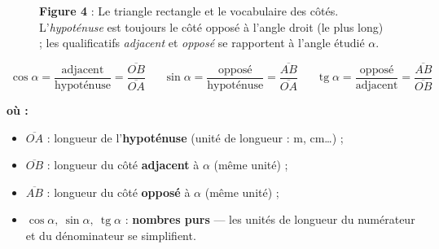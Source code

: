 \documentclass[11pt,a4paper]{article}
\newenvironment{ou}{%
  \par\smallskip\noindent\textbf{où :}\nopagebreak
  \begin{itemize}[leftmargin=1.8em,topsep=2pt,itemsep=1.5pt,parsep=0pt]}%
  {\end{itemize}}
\DeclareMathOperator{\tg}{tg}        %
\begin{document}
\begin{figure}[h]
\centering
{}
\caption*{\small\textbf{\textcolor{primary}{Figure 4}} : Le triangle rectangle et le vocabulaire
des côtés. L'\emph{hypoténuse} est toujours le côté opposé à l'angle droit (le plus long) ; les
qualificatifs \emph{adjacent} et \emph{opposé} se rapportent à l'angle étudié $\alpha$.}
\end{figure}

\begin{formule}
\[
\boxed{\;\cos\alpha=\frac{\text{adjacent}}{\text{hypoténuse}}=\frac{\overline{OB}}{\overline{OA}}\;}
\quad
\boxed{\;\sin\alpha=\frac{\text{opposé}}{\text{hypoténuse}}=\frac{\overline{AB}}{\overline{OA}}\;}
\quad
\boxed{\;\tg\alpha=\frac{\text{opposé}}{\text{adjacent}}=\frac{\overline{AB}}{\overline{OB}}\;}
\]
\begin{ou}
  \item $\overline{OA}$ : longueur de l'\textbf{hypoténuse} (unité de longueur : \si{\metre}, \si{\centi\metre}\dots) ;
  \item $\overline{OB}$ : longueur du côté \textbf{adjacent} à $\alpha$ (même unité) ;
  \item $\overline{AB}$ : longueur du côté \textbf{opposé} à $\alpha$ (même unité) ;
  \item $\cos\alpha,\ \sin\alpha,\ \tg\alpha$ : \textbf{nombres purs} --- les unités de longueur du
        numérateur et du dénominateur se simplifient.
\end{ou}
\end{formule}
\end{document}
